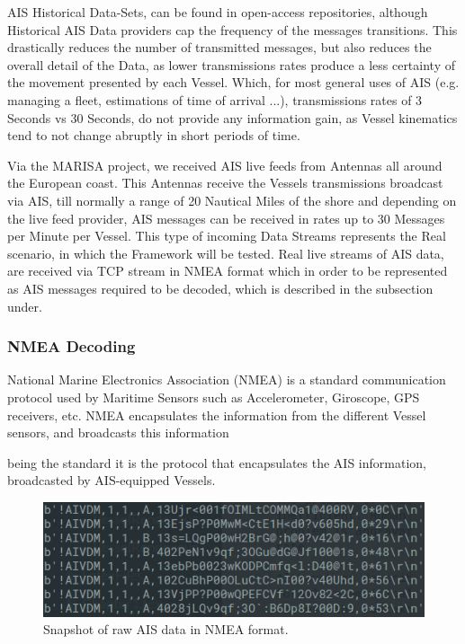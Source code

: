 AIS Historical Data-Sets, can be found in open-access repositories, although Historical AIS Data providers cap the frequency of the messages transitions. This drastically reduces the number of transmitted messages, but also reduces the overall detail of the Data, as lower transmissions rates produce a less certainty of the movement presented by each Vessel. Which, for most general uses of AIS (e.g. managing a fleet, estimations of time of arrival ...), transmissions rates of 3 Seconds vs 30 Seconds, do not provide any information gain, as Vessel kinematics tend to not change abruptly in short periods of time. 

Via the MARISA project, we received AIS live feeds from Antennas all around the European coast. This Antennas receive the Vessels transmissions broadcast via AIS, till normally a range of 20 Nautical Miles of the shore and depending on the live feed provider, AIS messages can be received in rates up to 30 Messages per Minute per Vessel. This type of incoming Data Streams represents the Real scenario, in which the Framework will be tested. Real live streams of AIS data, are received via TCP stream in NMEA format which in order to be represented as AIS messages required to be decoded, which is described in the subsection under.


\subsubsection{NMEA Decoding}
National Marine Electronics Association (NMEA) is a standard communication protocol used by Maritime Sensors such as Accelerometer, Giroscope, GPS receivers, etc.
NMEA encapsulates the information from the different Vessel sensors, and broadcasts this information

being the standard it is the protocol that encapsulates the AIS information, broadcasted by AIS-equipped Vessels. 

\begin{figure}[H]
	\centering
	\includegraphics[scale = .5]{figures/Ch3/NMEAexample.png}
    \caption{Snapshot of raw AIS data in NMEA format.}
    \label{fig:NMEAexample}
\end{figure}

